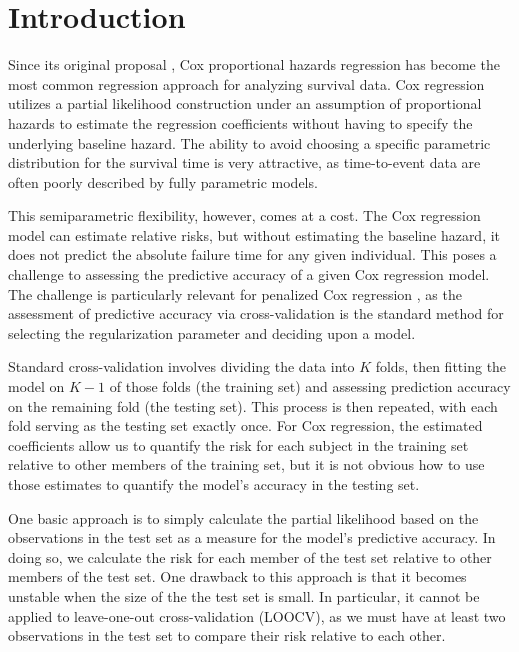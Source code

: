 \section{Introduction}

\par Since its original proposal \citep{Cox1972}, Cox proportional hazards regression has become the most common regression approach for analyzing survival data.  Cox regression utilizes a partial likelihood construction under an assumption of proportional hazards to estimate the regression coefficients without having to specify the underlying baseline hazard.  The ability to avoid choosing a specific parametric distribution for the survival time is very attractive, as time-to-event data are often poorly described by fully parametric models.

This semiparametric flexibility, however, comes at a cost. The Cox regression model can estimate relative risks, but without estimating the baseline hazard, it does not predict the absolute failure time for any given individual.  This poses a challenge to assessing the predictive accuracy of a given Cox regression model.  The challenge is particularly relevant for penalized Cox regression \citep{Tibshirani1997,Fan2002}, as the assessment of predictive accuracy via cross-validation is the standard method for selecting the regularization parameter and deciding upon a model.

\par Standard cross-validation involves dividing the data into $K$ folds, then fitting the model on $K-1$ of those folds (the training set) and assessing prediction accuracy on the remaining fold (the testing set). This process is then repeated, with each fold serving as the testing set exactly once. For Cox regression, the estimated coefficients allow us to quantify the risk for each subject in the training set relative to other members of the training set, but it is not obvious how to use those estimates to quantify the model's accuracy in the testing set.

\par One basic approach is to simply calculate the partial likelihood based on the observations in the test set as a measure for the model's predictive accuracy.  In doing so, we calculate the risk for each member of the test set relative to other members of the test set.  One drawback to this approach is that it becomes unstable when the size of the the test set is small.  In particular, it cannot be applied to leave-one-out cross-validation (LOOCV), as we must have at least two observations in the test set to compare their risk relative to each other.

